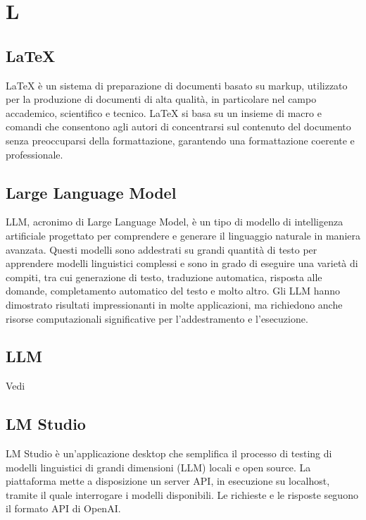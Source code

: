 \section{L}

\vspace{2em}
\subsection*{LaTeX}
LaTeX è un sistema di preparazione di documenti basato su markup, utilizzato per la produzione di documenti di alta qualità, in particolare nel campo accademico, scientifico e tecnico. LaTeX si basa su un insieme di macro e comandi che consentono agli autori di concentrarsi sul contenuto del documento senza preoccuparsi della formattazione, garantendo una formattazione coerente e professionale.

\vspace{2em}
\subsection*{Large Language Model}
LLM, acronimo di Large Language Model, è un tipo di modello di intelligenza artificiale progettato per comprendere e generare il linguaggio naturale in maniera avanzata. Questi modelli sono addestrati su grandi quantità di testo per apprendere modelli linguistici complessi e sono in grado di eseguire una varietà di compiti, tra cui generazione di testo, traduzione automatica, risposta alle domande, completamento automatico del testo e molto altro. Gli LLM hanno dimostrato risultati impressionanti in molte applicazioni, ma richiedono anche risorse computazionali significative per l'addestramento e l'esecuzione.

\vspace{2em}
\subsection*{LLM}
\par Vedi 

\vspace{2em}
\subsection*{LM Studio}
LM Studio è un'applicazione desktop che semplifica il processo di testing di modelli linguistici di grandi dimensioni (LLM) locali e open source. La piattaforma mette a disposizione un server API, in esecuzione su localhost, tramite il quale interrogare i modelli disponibili. Le richieste e le risposte seguono il formato API di OpenAI.

